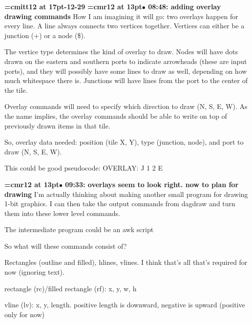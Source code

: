 {\medskip\noindent\bf\font\titlefont=cmitt12 at 17pt-12-29}\medskip
{\smallskip\noindent\bf\font\titlefont=cmr12 at 13pt\titlefont $\bullet$ 08:48: adding overlay drawing commands}\smallskip
How I am imagining it will go: two overlays happen for every line. A line always connects two vertices together. Vertices can either be a junction (+) or a node (\$).
\par

The vertice type determines the kind of overlay to draw. Nodes will have dots drawn on the eastern and southern ports to indicate arrowheads (these are input ports), and they will possibly have some lines to draw as well, depending on how much whitespace there is. Junctions will have lines from the port to the center of the tile.
\par

Overlay commands will need to specify which direction to draw (N, S, E, W). As the name implies, the overlay commands should be able to write on top of previously drawn items in that tile.
\par

So, overlay data needed: position (tile X, Y), type (junction, node), and port to draw (N, S, E, W).
\par

This could be good pseudocode: OVERLAY: J 1 2 E
\par

{\smallskip\noindent\bf\font\titlefont=cmr12 at 13pt\titlefont $\bullet$ 09:33: overlays seem to look right. now to plan for drawing}\smallskip
I'm actually thinking about making another small program for drawing 1-bit graphics. I can then take the output commands from dagdraw and turn them into these lower level commands.
\par

The intermediate program could be an awk script
\par

So what will these commands consist of?
\par

Rectangles (outline and filled), hlines, vlines. I think that's all that's required for now (ignoring text).
\par

rectangle (rc)/filled rectangle (rf): x, y, w, h
\par

vline (lv): x, y, length. positive length is downward, negative is upward (positive only for now)
\par

